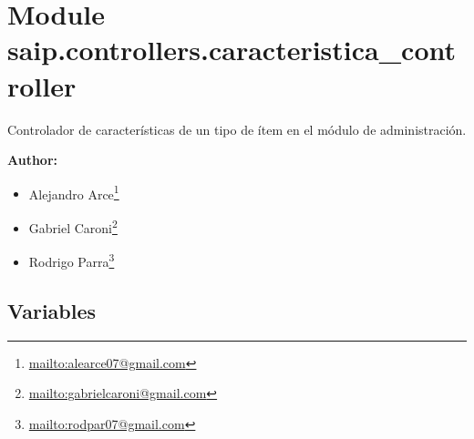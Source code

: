 %
%
%


\section{Module saip.controllers.caracteristica\_controller}

    \label{saip:controllers:caracteristica_controller}
Controlador de características de un tipo de ítem en el módulo de 
administración.

\textbf{Author:} \begin{itemize}
\setlength{\parskip}{0.6ex}
  \item Alejandro 
    Arce\footnote{\href{mailto:alearce07@gmail.com}{mailto:alearce07@gmail.com}}

  \item Gabriel 
    Caroni\footnote{\href{mailto:gabrielcaroni@gmail.com}{mailto:gabrielcaroni@gmail.com}}

  \item Rodrigo 
    Parra\footnote{\href{mailto:rodpar07@gmail.com}{mailto:rodpar07@gmail.com}}

\end{itemize}





  \subsection{Variables}

